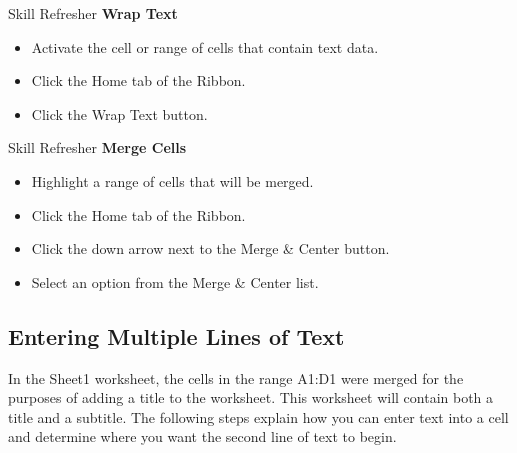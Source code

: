 \begin{center}
	\begin{sklbox}{Skill Refresher}
		\textbf{Wrap Text}
		\\
		\begin{itemize}
			\setlength{\itemsep}{0pt}
			\setlength{\parskip}{0pt}
			\setlength{\parsep}{0pt}
			
			\item Activate the cell or range of cells that contain text data.
			\item Click the Home tab of the Ribbon.
			\item Click the Wrap Text button.

		\end{itemize}
	\end{sklbox}
\end{center}

\begin{center}
	\begin{sklbox}{Skill Refresher}
		\textbf{Merge Cells}
		\\
		\begin{itemize}
			\setlength{\itemsep}{0pt}
			\setlength{\parskip}{0pt}
			\setlength{\parsep}{0pt}
			
			\item Highlight a range of cells that will be merged.
			\item Click the Home tab of the Ribbon.
			\item Click the down arrow next to the Merge \& Center button.
			\item Select an option from the Merge \& Center list.
			
		\end{itemize}
	\end{sklbox}
\end{center}


\subsection{Entering Multiple Lines of Text}

In the Sheet1 worksheet, the cells in the range \textsf{A1:D1} were merged for the purposes of adding a title to the worksheet. This worksheet will contain both a title and a subtitle. The following steps explain how you can enter text into a cell and determine where you want the second line of text to begin.


